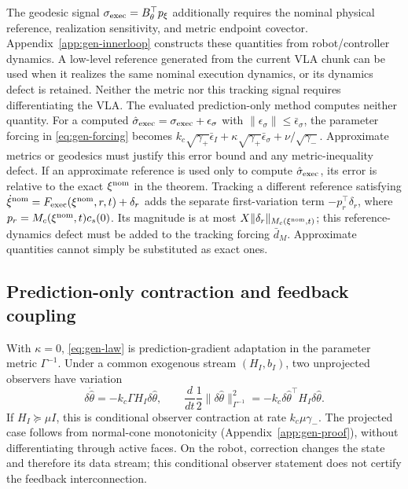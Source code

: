 The geodesic signal $\sigma_{\rm exec}=B_\theta^\top p_\xi$ additionally
requires the nominal physical reference, realization sensitivity, and
metric endpoint covector. Appendix~\ref{app:gen-innerloop} constructs
these quantities from robot/controller dynamics. A low-level reference
generated from the current VLA chunk can be used when it realizes the
same nominal execution dynamics, or its dynamics defect is retained.
Neither the metric nor this tracking signal requires differentiating the
VLA. The evaluated prediction-only method computes neither quantity.
For a computed $\hat\sigma_{\rm exec}=\sigma_{\rm exec}+\epsilon_\sigma$ with
$\|\epsilon_\sigma\|\le\bar\epsilon_\sigma$, the parameter forcing in
\eqref{eq:gen-forcing} becomes
$k_c\sqrt{\gamma_+}\bar\epsilon_I+
\kappa\sqrt{\gamma_+}\bar\epsilon_\sigma+\nu/\sqrt{\gamma_-}$.
Approximate metrics or geodesics must justify this error bound and any
metric-inequality defect. If an approximate reference is used only to
compute $\hat\sigma_{\rm exec}$, its error is relative to the exact $\xi^{\rm nom}$ in the
theorem. Tracking a different reference satisfying
$\dot\xi^{\rm nom}=F_{\rm exec}(\xi^{\rm nom},r,t)+\delta_r$ adds the separate first-variation term
$-p_r^\top\delta_r$, where $p_r=M_c(\xi^{\rm nom},t)c_s(0)$. Its magnitude is
at most $X\|\delta_r\|_{M_c(\xi^{\rm nom},t)}$; this reference-dynamics defect
must be added to the tracking forcing $\bar d_M$. Approximate quantities
cannot simply be substituted as exact ones.

\subsection{Prediction-only contraction and feedback coupling}
\label{sec:prediction-comparison}
With $\kappa=0$, \eqref{eq:gen-law} is prediction-gradient adaptation in
the parameter metric $\Gamma^{-1}$. Under a common exogenous stream
$(H_I,b_I)$, two unprojected observers have variation
\begin{equation}
 \delta\dot{\hat\theta}=-k_c\Gamma H_I\delta\hat\theta,\qquad
 \frac{d}{dt}\frac12\|\delta\hat\theta\|_{\Gamma^{-1}}^2
 =-k_c\delta\hat\theta^\top H_I\delta\hat\theta.
 \label{eq:observer-differential}
\end{equation}
If $H_I\succeq\mu I$, this is conditional observer contraction at rate
$k_c\mu\gamma_-$. The projected case follows from normal-cone
monotonicity (Appendix~\ref{app:gen-proof}), without differentiating
through active faces. On the robot, correction changes the state and
therefore its data stream; this conditional observer statement does not
certify the feedback interconnection.

